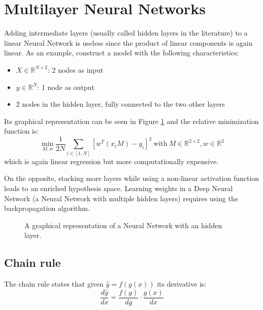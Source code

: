 \section{Multilayer Neural Networks}
Adding intermediate layers (usually called hidden layers in the literature)
to a linear Neural Network is useless
since the product of linear components is again linear.
As an example, construct a model with the following characteristics:
\begin{itemize}
    \item $X \in \mathbb{R}^{N \times 2}$: 2 nodes as input
    \item $y \in \mathbb{R}^N$: 1 node as output
    \item 2 nodes in the hidden layer, fully connected to the two other layers
\end{itemize}
Its graphical representation can be seen in Figure \ref{fig:nn-multi}
and the relative minimization function is:
$$ \displaystyle \min_{M, w} \frac{1}{2N} \sum_{i \in [1, N]} [ w^T (x_i M) - y_i ]^2
    \ \text{with} \
    M \in \mathbb{R}^{2 \times 2}, w \in \mathbb{R}^{2}$$
which is again linear regression but more computationally expensive.

On the opposite, stacking more layers while using a non-linear activation function
leads to an enriched hypothesis space. Learning weights in a Deep Neural Network
(a Neural Network with multiple hidden layers) requires using the backpropagation algorithm.

\begin{figure}[h]
    \centering
    \caption{A graphical representation of a Neural Network with an hidden layer.}
    \label{fig:nn-multi}
\end{figure}

\subsection{Chain rule}
The chain rule states that given $\hat{y} = f(g(x))$ its derivative is:
$$ \frac{d\hat{y}}{dx} = \frac{f(g)}{dg} \cdot \frac{g(x)}{dx} $$

